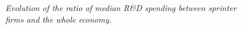 \documentclass[letterpaper,12pt]{article}
\theoremstyle{definition}
\begin{document}
\begin{figure}[htb]\centering \captionsetup{width=5.8in}
    \caption{\label{fig:RD_spending_rat}\textit{Evolution of the ratio of median R\&D spending between sprinter firms and the whole economy.}}
\end{figure}
\end{document}
